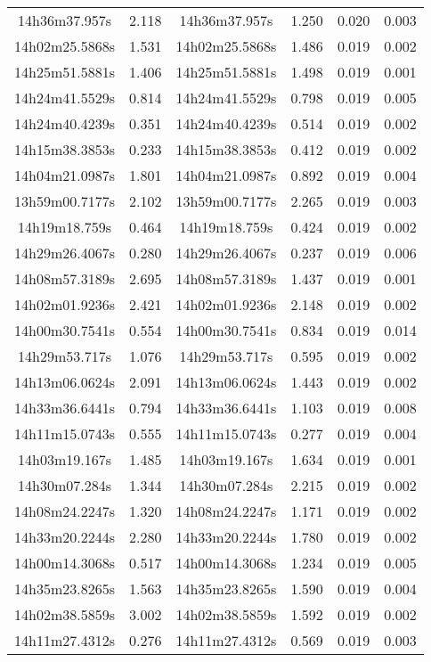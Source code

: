 \begin{table}
\begin{tabular}{cccccc}
14h36m37.957s & 2.118 & 14h36m37.957s & 1.250 & 0.020 & 0.003 \\
14h02m25.5868s & 1.531 & 14h02m25.5868s & 1.486 & 0.019 & 0.002 \\
14h25m51.5881s & 1.406 & 14h25m51.5881s & 1.498 & 0.019 & 0.001 \\
14h24m41.5529s & 0.814 & 14h24m41.5529s & 0.798 & 0.019 & 0.005 \\
14h24m40.4239s & 0.351 & 14h24m40.4239s & 0.514 & 0.019 & 0.002 \\
14h15m38.3853s & 0.233 & 14h15m38.3853s & 0.412 & 0.019 & 0.002 \\
14h04m21.0987s & 1.801 & 14h04m21.0987s & 0.892 & 0.019 & 0.004 \\
13h59m00.7177s & 2.102 & 13h59m00.7177s & 2.265 & 0.019 & 0.003 \\
14h19m18.759s & 0.464 & 14h19m18.759s & 0.424 & 0.019 & 0.002 \\
14h29m26.4067s & 0.280 & 14h29m26.4067s & 0.237 & 0.019 & 0.006 \\
14h08m57.3189s & 2.695 & 14h08m57.3189s & 1.437 & 0.019 & 0.001 \\
14h02m01.9236s & 2.421 & 14h02m01.9236s & 2.148 & 0.019 & 0.002 \\
14h00m30.7541s & 0.554 & 14h00m30.7541s & 0.834 & 0.019 & 0.014 \\
14h29m53.717s & 1.076 & 14h29m53.717s & 0.595 & 0.019 & 0.002 \\
14h13m06.0624s & 2.091 & 14h13m06.0624s & 1.443 & 0.019 & 0.002 \\
14h33m36.6441s & 0.794 & 14h33m36.6441s & 1.103 & 0.019 & 0.008 \\
14h11m15.0743s & 0.555 & 14h11m15.0743s & 0.277 & 0.019 & 0.004 \\
14h03m19.167s & 1.485 & 14h03m19.167s & 1.634 & 0.019 & 0.001 \\
14h30m07.284s & 1.344 & 14h30m07.284s & 2.215 & 0.019 & 0.002 \\
14h08m24.2247s & 1.320 & 14h08m24.2247s & 1.171 & 0.019 & 0.002 \\
14h33m20.2244s & 2.280 & 14h33m20.2244s & 1.780 & 0.019 & 0.002 \\
14h00m14.3068s & 0.517 & 14h00m14.3068s & 1.234 & 0.019 & 0.005 \\
14h35m23.8265s & 1.563 & 14h35m23.8265s & 1.590 & 0.019 & 0.004 \\
14h02m38.5859s & 3.002 & 14h02m38.5859s & 1.592 & 0.019 & 0.002 \\
14h11m27.4312s & 0.276 & 14h11m27.4312s & 0.569 & 0.019 & 0.003 \\

\end{tabular}
\end{table}
